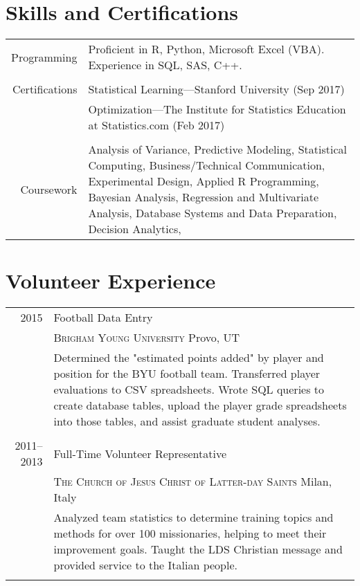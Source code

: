 \documentclass[a4paper,12pt]{article}
\begin{document}
\section{Skills and Certifications}
\begin{tabular}{rp{11cm}}
  Programming
  & Proficient in R, Python, Microsoft Excel (VBA). Experience in SQL, SAS, C++.\\ \\
  
  Certifications
  & Statistical Learning---Stanford University (Sep 2017)\\
  & Optimization---The Institute for Statistics Education at Statistics.com (Feb 2017)\\ \\
  
  Coursework
  & %
  Analysis of Variance, 
  Predictive Modeling, 
  Statistical Computing,
  Business/Technical Communication, 
  Experimental Design,
  Applied R Programming,
  Bayesian Analysis,
  Regression and Multivariate Analysis,
  Database Systems and Data Preparation,
  Decision Analytics,
  \\
\end{tabular}


\section{Volunteer Experience}
\begin{tabular}{r|p{11cm}}
  \textsc{2015} & Football Data Entry \\
  & \textsc{Brigham Young University} Provo, UT \\
  & \footnotesize{Determined the "estimated points added" by player and position for the BYU football team. Transferred player evaluations to CSV spreadsheets. Wrote SQL queries to create database tables, upload the player grade spreadsheets into those tables, and assist graduate student analyses.} \\ \multicolumn{2}{c}{} \\
  
  \textsc{2011--2013} & Full-Time Volunteer Representative \\
  & \textsc{The Church of Jesus Christ of Latter-day Saints} Milan, Italy \\
  & \footnotesize{Analyzed team statistics to determine training topics and methods for over 100 missionaries, helping to meet their improvement goals. Taught the LDS Christian message and provided service to the Italian people.} \\ \multicolumn{2}{c}{}
\end{tabular}
\end{document}
